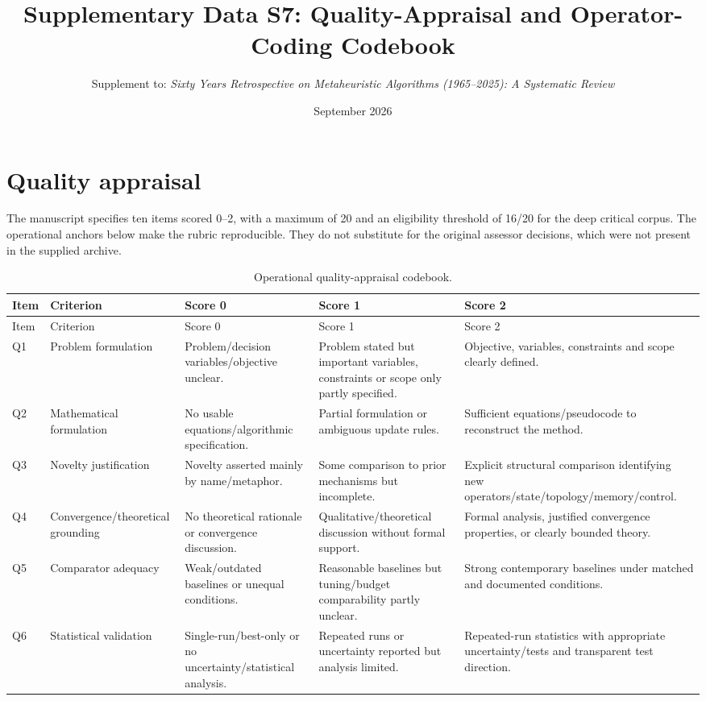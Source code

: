 \documentclass[8pt]{article}
\title{Supplementary Data S7: Quality-Appraisal and Operator-Coding Codebook}
\author{Supplement to: \textit{Sixty Years Retrospective on Metaheuristic Algorithms (1965--2025): A Systematic Review}}
\date{September 2026}
\begin{document}
\maketitle
\section*{Quality appraisal}
The manuscript specifies ten items scored 0--2, with a maximum of 20 and an eligibility threshold of 16/20 for the deep critical corpus. The operational anchors below make the rubric reproducible. They do not substitute for the original assessor decisions, which were not present in the supplied archive.

\begin{longtable}{P{1.0cm}P{4.2cm}P{3.6cm}P{3.6cm}P{3.6cm}}
\caption{Operational quality-appraisal codebook.}\\
\toprule
Item & Criterion & Score 0 & Score 1 & Score 2\\
\midrule\endfirsthead
\toprule Item & Criterion & Score 0 & Score 1 & Score 2\\\midrule\endhead
Q1 & Problem formulation & Problem/decision variables/objective unclear. & Problem stated but important variables, constraints or scope only partly specified. & Objective, variables, constraints and scope clearly defined.\\
Q2 & Mathematical formulation & No usable equations/algorithmic specification. & Partial formulation or ambiguous update rules. & Sufficient equations/pseudocode to reconstruct the method.\\
Q3 & Novelty justification & Novelty asserted mainly by name/metaphor. & Some comparison to prior mechanisms but incomplete. & Explicit structural comparison identifying new operators/state/topology/memory/control.\\
Q4 & Convergence/theoretical grounding & No theoretical rationale or convergence discussion. & Qualitative/theoretical discussion without formal support. & Formal analysis, justified convergence properties, or clearly bounded theory.\\
Q5 & Comparator adequacy & Weak/outdated baselines or unequal conditions. & Reasonable baselines but tuning/budget comparability partly unclear. & Strong contemporary baselines under matched and documented conditions.\\
Q6 & Statistical validation & Single-run/best-only or no uncertainty/statistical analysis. & Repeated runs or uncertainty reported but analysis limited. & Repeated-run statistics with appropriate uncertainty/tests and transparent test direction.\\

\end{longtable}
\end{document}
